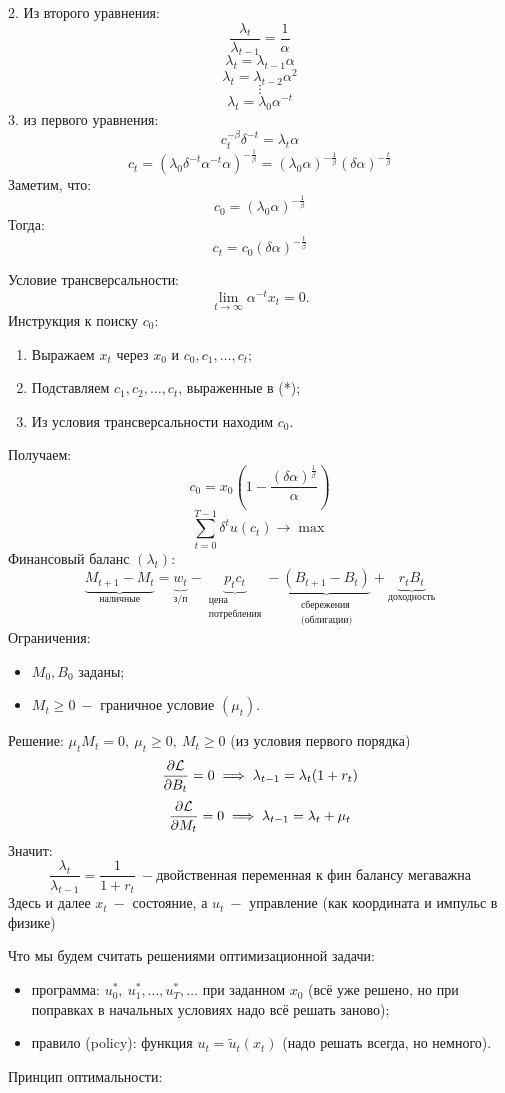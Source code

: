 \documentclass[a4paper,11pt]{article}
\begin{document}
2. Из второго уравнения:
\[\dfrac{\lambda_t}{\lambda_{t-1}} = \dfrac{1}{\alpha}\]
\[\lambda_t = \lambda_{t-1}\alpha\]
\[\lambda_t = \lambda_{t-2}\alpha^2\]
\[\vdots\]
\[\lambda_t = \lambda_{0}\alpha^{-t}\]
3. из первого уравнения:
\[c_t^{-\beta}\delta^{-t} = \lambda_t\alpha\]
\[c_t = \left(\lambda_0\delta^{-t}\alpha^{-t}\alpha\right)^{-\frac{1}{\beta}} = (\lambda_0\alpha)^{-\frac{1}{\beta}}(\delta\alpha)^{-\frac{t}{\beta}}\]
Заметим, что:
\[c_0 = (\lambda_0\alpha)^{-\frac{1}{\beta}}\]
Тогда:
\[c_t = c_0(\delta\alpha)^{-\frac{t}{\beta}} \tag{*}\]

Условие трансверсальности:
\[\lim_{t\to\infty}\alpha^{-t}x_t = 0.\]
Инструкция к поиску $c_0$:
\begin{enumerate}
    \item Выражаем $x_t$ через $x_0$ и $c_0, c_1, \ldots, c_t$;
    \item Подставляем $c_1, c_2, \ldots, c_t$, выраженные в (*);
    \item Из условия трансверсальности находим $c_0$.
\end{enumerate}
Получаем:
\[c_0 = x_0\left(1 - \dfrac{(\delta\alpha)^\frac{1}{\beta}}{\alpha}\right)\]
\newpage
{}
\[\sum_{t=0}^{T-1}\delta^tu(c_t) \to \max\]
Финансовый баланс $(\lambda_t)$:
\[\underbrace{M_{t+1} - M_t}_{\text{наличные}} = \underbrace{w_t}_{\text{з/п}} - \underbrace{p_tc_t}_{\substack{\text{цена}\\{\text{потребления}}}} - \underbrace{(B_{t+1} - B_t)}_{\substack{\text{сбережения}\\\text{(облигации)}}} + \underbrace{r_tB_t}_{\text{доходность}}\]
Ограничения:
\begin{itemize}
    \item $M_0, B_0$ заданы;
    \item $M_t \geq 0\ -$ граничное условие $(\mu_t)$.
\end{itemize}
Решение: $\mu_tM_t = 0,\ \mu_t \geq 0,\ M_t \geq 0$ (из условия первого порядка)
\[\dfrac{\partial\mathcal{L}}{\partial B_t} = 0 \implies \lambda_{t-1} = \lambda_t(1 + r_t)\]
\[\dfrac{\partial\mathcal{L}}{\partial M_t} = 0 \implies \lambda_{t-1} = \lambda_t + \mu_t\]
Значит:
\[\frac{\lambda_t}{\lambda_{t-1}} = \frac{1}{1 + r_t}\ - \text{двойственная переменная к фин балансу мегаважна}\]
\newpage
{}
Здесь и далее $x_t\ -$ состояние, а $u_t\ -$ управление (как координата и импульс в физике)

Что мы будем считать решениями оптимизационной задачи:
\begin{itemize}
    \item программа: $u_0^*,\ u_1^*,\dots,u_T^*,\ldots$ при заданном $x_0$ (всё уже решено, но при поправках в начальных условиях надо всё решать заново);
    \item правило (policy): функция $u_t = \widetilde{u}_t(x_t)$ (надо решать всегда, но немного).
\end{itemize}
Принцип оптимальности:
\end{document}
